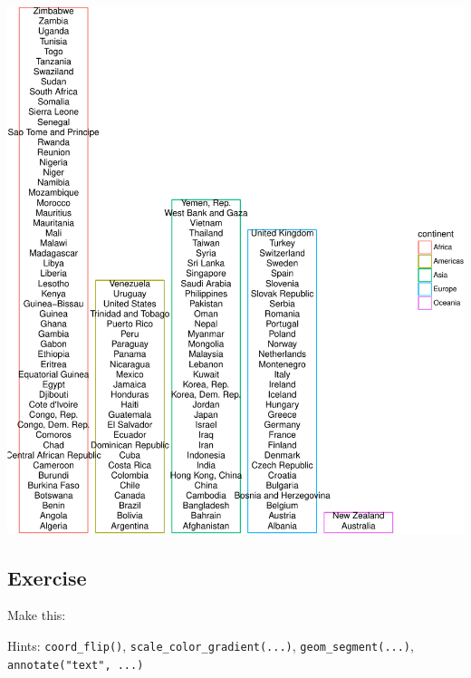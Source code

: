 \documentclass[12pt,]{krantz}
\theoremstyle{definition}
\theoremstyle{definition}
\theoremstyle{definition}
\theoremstyle{remark}
\begin{document}
\includegraphics{04_plotting_files/figure-latex/unnamed-chunk-17-1.pdf}

\newpage

\hypertarget{exercise-23}{%
\subsection{Exercise}\label{exercise-23}}

Make this:

Hints: \texttt{coord\_flip()}, \texttt{scale\_color\_gradient(...)},
\texttt{geom\_segment(...)}, \texttt{annotate("text",\ ...)}
\end{document}
